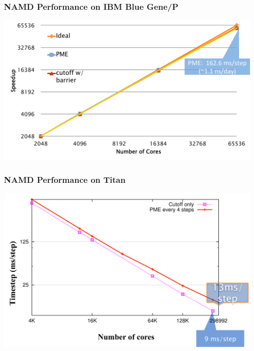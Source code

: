 \begin{frame}[t]
\frametitle{NAMD Performance on IBM Blue Gene/P}
  \begin{center} \includegraphics[width=\textwidth]{figures/namd_bgp.pdf} \end{center}
\end{frame}

\begin{frame}[t]
\frametitle{NAMD Performance on Titan}
  \begin{center} \includegraphics[width=.9\textwidth]{figures/namd_titan.pdf} \end{center}
\end{frame}

